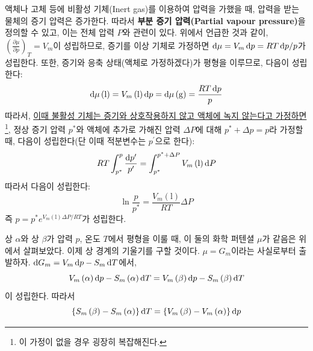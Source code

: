         \par 액체나 고체 등에 비활성 기체(Inert gas)를 이용하여 압력을 가했을 때, 압력을 받는 물체의 증기 압력은 증가한다. 따라서 
        \textbf{부분 증기 압력(Partial vapour pressure)}을 정의할 수 있고, 이는 전체 압력 $P$와 관련이 있다. 
        위에서 언급한 것과 같이, $\displaystyle\left(\frac{\partial \mu}{\partial p}\right)_T = V_m$이 성립하므로, 증기를 이상 기체로 가정하면 
        $\displaystyle\operatorname{d\!} \mu = V_m \operatorname{d\!} p = RT \operatorname{d\!} p /p$가 성립한다. 또한, 증기와 응축 상태(액체로 가정하겠다)가 평형을 이루므로, 다음이 성립한다: 
        $$
        \operatorname{d\!} \mu\left(\mathrm{l}\right) = V_m\left(\mathrm{l}\right)\operatorname{d\!} p 
        = \operatorname{d\!} \mu\left(\mathrm{g}\right) = \frac{RT \operatorname{d\!} p}{p}
        $$
        따라서, \underline{이때 불활성 기체는 증기와 상호작용하지 않고 액체에 녹지 않는다고 가정하면}\footnote[12]{%
        이 가정이 없을 경우 굉장히 복잡해진다.}, 정상 증기 압력 $p^\ast$와 액체에 추가로 가해진 압력 $\Delta P$에 대해 $p^\ast + \Delta p = p$라 
        가정할 때, 다음이 성립한다(단 이때 적분변수는 $p^\prime$으로 한다):
        \begin{equation*}
            RT \int_{p^\ast}^{p}\frac{\operatorname{d\!} {p^\prime}}{p^{\prime}} = \int_{p^\ast}^{p^\ast + \Delta P}V_m\left(\mathrm{l}\right)\operatorname{d\!} P
        \end{equation*}
        따라서 다음이 성립한다:
        \begin{equation*}
            \ln{\frac{p}{p^\ast}}=\frac{V_m\left(\mathrm{l}\right)}{RT}\Delta P
        \end{equation*}
        즉 $p=p^\ast e^{V_m\left(\mathrm{l}\right)\Delta P/RT}$가 성립한다.
        \par 상 $\alpha$와 상 $\beta$가 압력 $p$, 온도 $T$에서 평형을 이룰 때, 이 둘의 화학 퍼텐셜 $\mu$가 같음은 위에서 살펴보았다. 
        이제 상 경계의 기울기를 구할 것이다. $\mu = G_m$이라는 사실로부터 출발하자. 
        $\operatorname{d\!} G_m = V_m \operatorname{d\!} p - S_m \operatorname{d\!} T$에서, 
        \begin{equation*}
            V_m \left(\alpha\right)\operatorname{d\!} p - S_m \left(\alpha\right)\operatorname{d\!} T = V_m \left(\beta\right)\operatorname{d\!} p - S_m \left(\beta\right)\operatorname{d\!} T
        \end{equation*}
        이 성립한다. 따라서 
        \begin{equation*}
            \left\{S_m\left(\beta\right) - S_m\left(\alpha\right)\right\}\operatorname{d\!} T = \left\{V_m\left(\beta\right) - V_m\left(\alpha\right)\right\}\operatorname{d\!} p
        \end{equation*}
